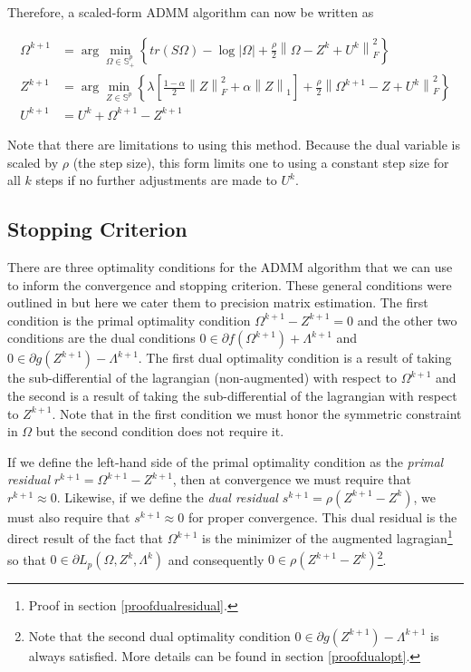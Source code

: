 \documentclass[11pt,]{report}
\theoremstyle{definition}
\theoremstyle{definition}
\theoremstyle{definition}
\theoremstyle{remark}
\begin{document}
Therefore, a scaled-form ADMM algorithm can now be written as

\begin{equation}
\begin{split}
  \Omega^{k + 1} &= \arg\min_{\Omega \in \mathbb{S}_{+}^{p}}\left\{ tr\left(S\Omega\right) - \log\left|\Omega\right| + \frac{\rho}{2}\left\| \Omega - Z^{k} + U^{k} \right\|_{F}^{2} \right\} \\
  Z^{k + 1} &= \arg\min_{Z \in \mathbb{S}^{p}}\left\{ \lambda\left[ \frac{1 - \alpha}{2}\left\| Z \right\|_{F}^{2} + \alpha\left\| Z \right\|_{1} \right] + \frac{\rho}{2}\left\| \Omega^{k + 1} - Z + U^{k} \right\|_{F}^{2} \right\} \\
  U^{k + 1} &= U^{k} + \Omega^{k + 1} - Z^{k + 1}
\end{split}
\label{eq:ADMMscaled}
\end{equation}

Note that there are limitations to using this method. Because the dual variable is scaled by \(\rho\) (the step size), this form limits one to using a constant step size for all \(k\) steps if no further adjustments are made to \(U^{k}\).

\hypertarget{ADMMstop}{%
\subsection{Stopping Criterion}\label{ADMMstop}}

There are three optimality conditions for the ADMM algorithm that we can use to inform the convergence and stopping criterion. These general conditions were outlined in \citet{boyd2011distributed} but here we cater them to precision matrix estimation. The first condition is the primal optimality condition \(\Omega^{k + 1} - Z^{k + 1} = 0\) and the other two conditions are the dual conditions \(0 \in \partial f\left(\Omega^{k + 1}\right) + \Lambda^{k + 1}\) and \(0 \in \partial g\left(Z^{k + 1}\right) - \Lambda^{k + 1}\). The first dual optimality condition is a result of taking the sub-differential of the lagrangian (non-augmented) with respect to \(\Omega^{k + 1}\) and the second is a result of taking the sub-differential of the lagrangian with respect to \(Z^{k + 1}\). Note that in the first condition we must honor the symmetric constraint in \(\Omega\) but the second condition does not require it.

If we define the left-hand side of the primal optimality condition as the \emph{primal residual} \(r^{k + 1} = \Omega^{k + 1} - Z^{k + 1}\), then at convergence we must require that \(r^{k + 1} \approx 0\). Likewise, if we define the \emph{dual residual} \(s^{k + 1} = \rho\left( Z^{k + 1} - Z^{k} \right)\), we must also require that \(s^{k + 1} \approx 0\) for proper convergence. This dual residual is the direct result of the fact that \(\Omega^{k + 1}\) is the minimizer of the augmented lagragian\footnote{Proof in section \ref{proofdualresidual}.} so that \(0 \in \partial L_{p}\left( \Omega, Z^{k}, \Lambda^{k} \right)\) and consequently \(0 \in \rho\left( Z^{k + 1} - Z^{k} \right)\)\footnote{Note that the second dual optimality condition \(0 \in \partial g\left(Z^{k + 1}\right) - \Lambda^{k + 1}\) is always satisfied. More details can be found in section \ref{proofdualopt}.}.
\end{document}
